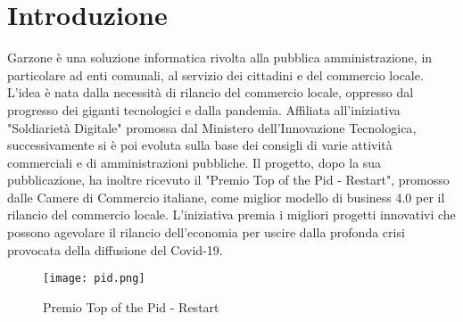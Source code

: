 \mainmatter
\chapter{Introduzione}
Garzone è una soluzione informatica rivolta alla pubblica amministrazione, in particolare ad enti comunali, al servizio dei cittadini e del commercio locale. L'idea è nata dalla necessità di rilancio del commercio locale, oppresso dal progresso dei giganti tecnologici e dalla pandemia. Affiliata all'iniziativa "Soldiarietà Digitale" promossa dal Ministero dell’Innovazione Tecnologica\cite{MISE}, successivamente si è poi evoluta sulla base dei consigli di varie attività commerciali e di amministrazioni pubbliche. Il progetto, dopo la sua pubblicazione, ha inoltre ricevuto il "Premio Top of the Pid - Restart"\cite{PID}, promosso dalle Camere di Commercio italiane, come miglior modello di business 4.0 per il rilancio del commercio locale. L’iniziativa premia i migliori progetti innovativi che possono agevolare il rilancio dell’economia per uscire dalla profonda crisi provocata della diffusione del Covid-19.
\begin{figure}[!htb]
    \centering
    \texttt{[image: pid.png]}
    \caption{Premio Top of the Pid - Restart}
\end{figure}
